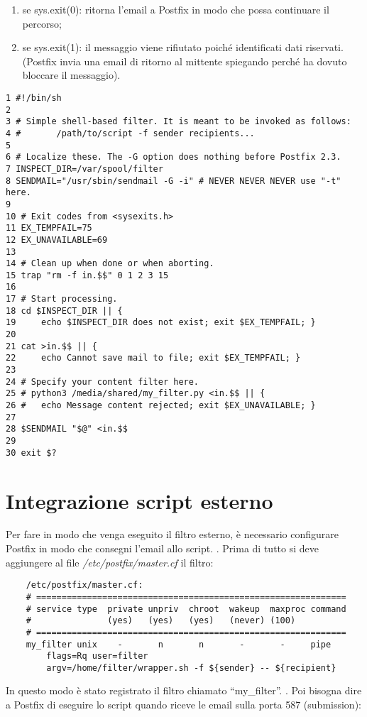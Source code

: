     
    \begin{enumerate}
        \item se sys.exit(0): ritorna l'email a Postfix in modo che possa continuare il percorso;
        \item se sys.exit(1): il messaggio viene rifiutato poiché identificati dati riservati. 
        (Postfix invia una email di ritorno al mittente spiegando perché ha dovuto bloccare il messaggio). 
    \end{enumerate}

    \begin{verbatim}
1 #!/bin/sh
2 
3 # Simple shell-based filter. It is meant to be invoked as follows:
4 #       /path/to/script -f sender recipients...
5 
6 # Localize these. The -G option does nothing before Postfix 2.3.
7 INSPECT_DIR=/var/spool/filter
8 SENDMAIL="/usr/sbin/sendmail -G -i" # NEVER NEVER NEVER use "-t" here.
9 
10 # Exit codes from <sysexits.h>
11 EX_TEMPFAIL=75
12 EX_UNAVAILABLE=69
13 
14 # Clean up when done or when aborting.
15 trap "rm -f in.$$" 0 1 2 3 15
16 
17 # Start processing.
18 cd $INSPECT_DIR || {
19     echo $INSPECT_DIR does not exist; exit $EX_TEMPFAIL; }
20 
21 cat >in.$$ || { 
22     echo Cannot save mail to file; exit $EX_TEMPFAIL; }
23 
24 # Specify your content filter here.
25 # python3 /media/shared/my_filter.py <in.$$ || {
26 #   echo Message content rejected; exit $EX_UNAVAILABLE; }
27 
28 $SENDMAIL "$@" <in.$$
29 
30 exit $?
    \end{verbatim}

    \section{Integrazione script esterno}
    Per fare in modo che venga eseguito il filtro esterno, è necessario configurare Postfix in modo
    che consegni l'email allo script.
    \newline
    . Prima di tutto si deve aggiungere al file \textit{/etc/postfix/master.cf} il filtro:

    \begin{verbatim}
    /etc/postfix/master.cf:
    # =============================================================
    # service type  private unpriv  chroot  wakeup  maxproc command
    #               (yes)   (yes)   (yes)   (never) (100)
    # =============================================================
    my_filter unix	  -	      n	      n	      -	      -	    pipe
	    flags=Rq user=filter 
        argv=/home/filter/wrapper.sh -f ${sender} -- ${recipient}
    \end{verbatim}
    In questo modo è stato registrato il filtro chiamato ``my\_filter''.
    \newline
    . Poi bisogna dire a Postfix di eseguire lo script quando riceve le email sulla porta 587 (submission):

